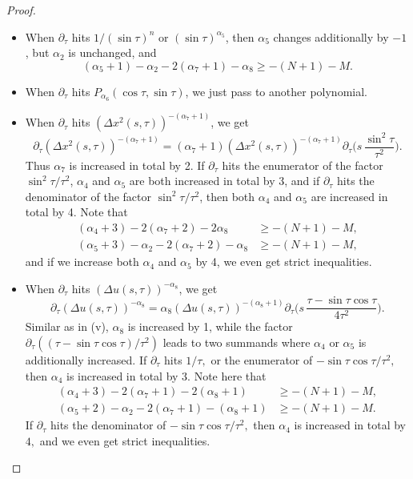 \documentclass[10pt,a4paper]{amsart}
\begin{document}
\begin{proof}
\begin{itemize}
\item[(iii)] When $\partial_\tau$ hits $1/(\sin\tau)^{n}$ or $(\sin \tau)^{\alpha_5}$, then $\alpha_5$ changes additionally by  $-1$, but $\alpha_2$ is unchanged, and 
\[
(\alpha_5 + 1)-\alpha_2-2(\alpha_7 + 1)-\alpha_8  \ge -(N + 1)-M.
\]
\item[(iv)] When $\partial_\tau$ hits $P_{\alpha_6}(\cos\tau,\sin\tau)$, we just pass to another polynomial.

\item[(v)] When $\partial_\tau$ hits $(\Delta x^2 (s,\tau))^{-(\alpha_7+1)}$, we get
\[
\partial_\tau (\Delta x^2 (s,\tau))^{-(\alpha_7+1)}
 =( \alpha_7+1) (\Delta x^2 (s,\tau))^{-(\alpha_7 + 1)} \partial_\tau\Big( s \, \frac{\sin^2\tau}{\tau^2} \Big).
\]
Thus $\alpha_7$ is increased in total by 2. If $\partial_\tau$ hits the enumerator  of the factor $\sin^2\tau/\tau^2$, $\alpha_ 4 $ and $\alpha_5$ are both increased in total by 3, and if $\partial_\tau$ hits the denominator   of the factor $\sin^2\tau/\tau^2$, then both $\alpha_ 4 $ and $\alpha_5$ are increased in total by 4.   Note that
\begin{align*}
(\alpha_ 4 + 3 )-2(\alpha_7 + 2)-2\alpha_8 & \ge -(N + 1)-M, \\
(\alpha_5 + 3)-\alpha_2-2(\alpha_7 + 2)-\alpha_8 & \ge -(N + 1)-M,
\end{align*}
and if we increase both $\alpha_4$ and $\alpha_5$ by 4, we even get strict inequalities.

\item[(vi)] When $\partial_\tau$ hits $(\Delta u(s,\tau))^{-\alpha_8}$, we get
\[
\partial_\tau \left(\Delta u(s,\tau)\right)^{-\alpha_8}
 = \alpha_8 \left(\Delta u(s,\tau)\right)^{-(\alpha_8 + 1)} \partial_\tau\Big( s \, \frac{\tau-\sin\tau\cos\tau}{4\tau^2} \Big).
\]
Similar as in (v), $\alpha_8$ is increased by 1, while the factor $\partial_\tau( (\tau-\sin\tau\cos\tau)/\tau^2 )$ leads to two summands where $\alpha_ 4 $ or $\alpha_5$ is additionally increased.  If $\partial_\tau$ hits $1/\tau,$ or the enumerator of $-\sin\tau\cos\tau/\tau^2,$ then $\alpha_4$ is increased in total by $3$. Note here that
\begin{align*}
(\alpha_ 4 + 3 )-2(\alpha_7 + 1)-2(\alpha_8 + 1) &\ge -(N + 1)-M,\\
(\alpha_5 + 2)-\alpha_2-2(\alpha_7 + 1)-(\alpha_8 + 1) &\ge -(N + 1)-M.
\end{align*}
If $\partial_\tau$ hits  the denominator of $-\sin\tau\cos\tau/\tau^2,$ then $\alpha_4$ is increased in total by $4,$ and we even get strict inequalities.
\end{itemize}


\end{proof}
\end{document}

